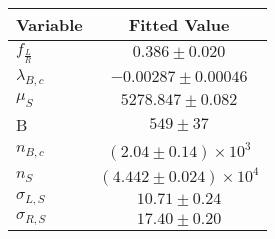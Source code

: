 \begin{tabular}[t]{lc}
\hline
Variable &Fitted Value\\
\hline\hline
$f_{\frac{L}{R}}$&$0.386\pm0.020$\\
\hline
$\lambda_{B,c}$&$-0.00287\pm0.00046$\\
\hline
$\mu_S$&$5278.847\pm0.082$\\
\hline
B&$549\pm37$\\
\hline
$n_{B,c}$&$(2.04\pm0.14)\times 10^3$\\
\hline
$n_S$&$(4.442\pm0.024)\times 10^4$\\
\hline
$\sigma_{L, S}$&$10.71\pm0.24$\\
\hline
$\sigma_{R, S}$&$17.40\pm0.20$\\
\hline
\end{tabular}